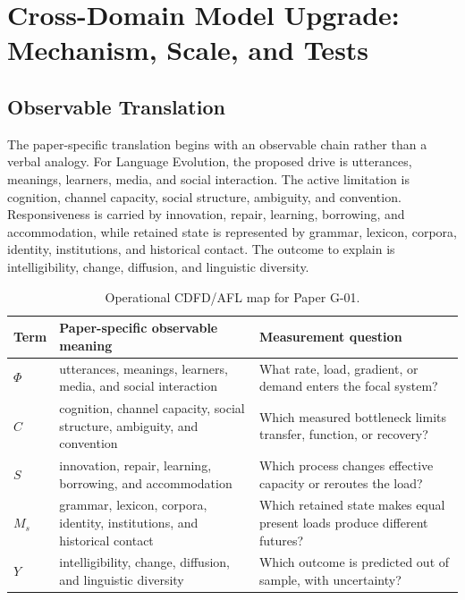 \documentclass[11pt,a4paper]{article}
\begin{document}
\section{Cross-Domain Model Upgrade: Mechanism, Scale, and Tests}

\subsection{Observable Translation}

The paper-specific translation begins with an observable chain rather than a
verbal analogy. For Language Evolution, the proposed drive is utterances, meanings, learners, media, and social interaction.
The active limitation is cognition, channel capacity, social structure, ambiguity, and convention. Responsiveness is carried by
innovation, repair, learning, borrowing, and accommodation, while retained state is represented by
grammar, lexicon, corpora, identity, institutions, and historical contact. The outcome to explain is intelligibility, change, diffusion, and linguistic diversity.

\begin{table}[htbp]
\centering
\small
\caption{Operational CDFD/AFL map for Paper G-01.}
\begin{tabularx}{\textwidth}{|l|X|X|}
\hline
\textbf{Term} & \textbf{Paper-specific observable meaning} & \textbf{Measurement question} \\
\hline
$\Phi$ & utterances, meanings, learners, media, and social interaction & What rate, load, gradient, or demand enters the focal system? \\
\hline
$C$ & cognition, channel capacity, social structure, ambiguity, and convention & Which measured bottleneck limits transfer, function, or recovery? \\
\hline
$S$ & innovation, repair, learning, borrowing, and accommodation & Which process changes effective capacity or reroutes the load? \\
\hline
$M_s$ & grammar, lexicon, corpora, identity, institutions, and historical contact & Which retained state makes equal present loads produce different futures? \\
\hline
$Y$ & intelligibility, change, diffusion, and linguistic diversity & Which outcome is predicted out of sample, with uncertainty? \\
\hline
\end{tabularx}
\end{table}
\end{document}
